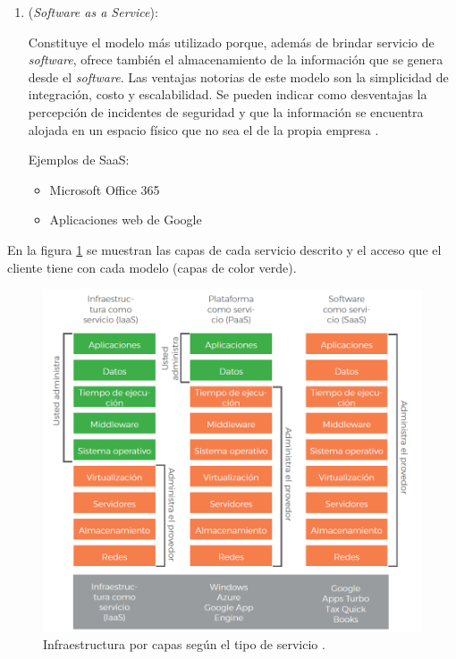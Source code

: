\begin{enumerate}
\item {} (\emph{Software as a Service}): 

Constituye el modelo más utilizado porque, además de brindar servicio de \emph{software}, ofrece también el almacenamiento de la información que se genera desde el \emph{software}. Las ventajas notorias de este modelo son la simplicidad de integración, costo y escalabilidad. Se pueden indicar como desventajas la percepción de incidentes de seguridad y que la información se encuentra alojada en un espacio físico que no sea el de la propia empresa \citep{BOOK:2}. 

Ejemplos de SaaS:

\begin{itemize}
\item Microsoft Office 365
\item Aplicaciones web de Google
\end{itemize}

\vspace{0.5cm}

\end{enumerate}

En la figura \ref{fig:capas-servicios} se muestran las capas de cada servicio descrito y el acceso que el cliente tiene con cada modelo (capas de color verde).

\begin{figure}[htbp]
	\centering
	\includegraphics[width=.8\textwidth]{./Figures/capas-servicios.png}
	\caption{Infraestructura por capas según el tipo de servicio  \citep{BOOK:2}.}

	\label{fig:capas-servicios}
\end{figure}


